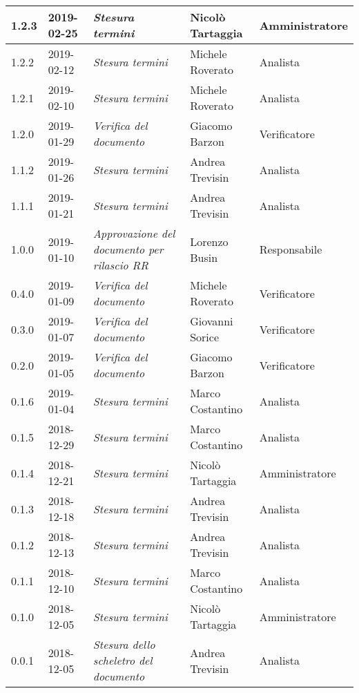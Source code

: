 \begin{longtable}{C{2cm}|C{2.5cm}|C{4.5cm}|C{2.5cm}|C{3cm}}
		1.2.3 & 2019-02-25 & \emph{Stesura termini} & Nicolò Tartaggia & Amministratore \\
		\hline
	
		1.2.2 & 2019-02-12 & \emph{Stesura termini} & Michele Roverato & Analista \\
		\hline
	
		1.2.1 & 2019-02-10 & \emph{Stesura termini} & Michele Roverato & Analista \\
		\hline
	
		1.2.0 & 2019-01-29 & \emph{Verifica del documento} & Giacomo Barzon & Verificatore \\
		\hline
	
		1.1.2 & 2019-01-26 & \emph{Stesura termini} & Andrea Trevisin & Analista \\
		\hline
	
		1.1.1 & 2019-01-21 & \emph{Stesura termini} & Andrea Trevisin & Analista \\
		\hline
		
		1.0.0 & 2019-01-10 & \emph{Approvazione del documento per rilascio RR} & Lorenzo Busin & Responsabile \\
		\hline
		
		0.4.0 & 2019-01-09 & \emph{Verifica del documento} & Michele Roverato & Verificatore \\
		\hline
		
		0.3.0 & 2019-01-07 & \emph{Verifica del documento} & Giovanni Sorice & Verificatore \\
		\hline
		
		0.2.0 & 2019-01-05 & \emph{Verifica del documento} & Giacomo Barzon & Verificatore \\
		\hline
		
		0.1.6 & 2019-01-04 & \emph{Stesura termini} & Marco Costantino & Analista \\
		\hline
		
		0.1.5 & 2018-12-29 & \emph{Stesura termini} & Marco Costantino & Analista \\
		\hline
		
		0.1.4 & 2018-12-21 & \emph{Stesura termini} & Nicolò Tartaggia & Amministratore \\
		\hline
		
		0.1.3 & 2018-12-18 & \emph{Stesura termini} & Andrea Trevisin & Analista \\
		\hline
		
		0.1.2 & 2018-12-13 & \emph{Stesura termini} & Andrea Trevisin & Analista \\
		\hline
		
		0.1.1 & 2018-12-10 & \emph{Stesura termini} & Marco Costantino & Analista \\
		\hline
		
		0.1.0 & 2018-12-05 & \emph{Stesura termini} & Nicolò Tartaggia & Amministratore \\
		\hline
		
		0.0.1 & 2018-12-05 & \emph{Stesura dello scheletro del documento} & Andrea Trevisin & Analista \\
		
	\end{longtable}


\clearpage